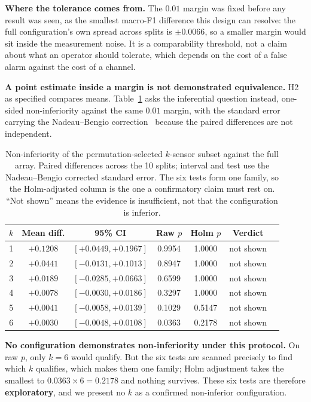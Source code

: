 \documentclass[conference]{IEEEtran}
\begin{document}
\textbf{Where the tolerance comes from.} The $0.01$ margin was fixed before
any result was seen, as the smallest macro-F1 difference this design can
resolve: the full configuration's own spread across splits is $\pm 0.0066$, so a
smaller margin would sit inside the measurement noise. It is
a comparability threshold, not a claim about what an operator should tolerate,
which depends on the cost of a false alarm against the cost of a channel.

\textbf{A point estimate inside a margin is not demonstrated equivalence.}
H2 as specified compares means. Table~\ref{tab:noninf} asks the inferential
question instead, one-sided non-inferiority against the same $0.01$ margin,
with the standard error carrying the Nadeau--Bengio
correction~\cite{nadeau2003} because the paired differences are not
independent.

\begin{table}[t]
\centering
\caption{Non-inferiority of the permutation-selected $k$-sensor subset against
the full array. Paired differences across the 10 splits; interval and test use
the Nadeau--Bengio corrected standard error. The six tests form one family, so
the Holm-adjusted column is the one a confirmatory claim must rest on. ``Not
shown'' means the evidence is insufficient, not that the configuration is
inferior.}
\label{tab:noninf}
\footnotesize
\setlength{\tabcolsep}{3pt}
\begin{tabular}{ccccccl}
\toprule
$k$ & Mean diff. & 95\% CI & Raw $p$ & Holm $p$ & Verdict \\
\midrule
1 & $+0.1208$ & $[+0.0449, +0.1967]$ & 0.9954 & 1.0000 & not shown \\
2 & $+0.0441$ & $[-0.0131, +0.1013]$ & 0.8947 & 1.0000 & not shown \\
3 & $+0.0189$ & $[-0.0285, +0.0663]$ & 0.6599 & 1.0000 & not shown \\
4 & $+0.0078$ & $[-0.0030, +0.0186]$ & 0.3297 & 1.0000 & not shown \\
5 & $+0.0041$ & $[-0.0058, +0.0139]$ & 0.1029 & 0.5147 & not shown \\
6 & $+0.0030$ & $[-0.0048, +0.0108]$ & 0.0363 & 0.2178 & not shown \\
\bottomrule
\end{tabular}
\end{table}

\textbf{No configuration demonstrates non-inferiority under this protocol.}
On raw $p$, only $k=6$ would qualify. But the six tests are scanned precisely
to find which $k$ qualifies, which makes them one family; Holm adjustment
takes the smallest to $0.0363\times6=0.2178$ and nothing survives. These six
tests are therefore \textbf{exploratory}, and we present no $k$ as a confirmed
non-inferior configuration.
\end{document}
